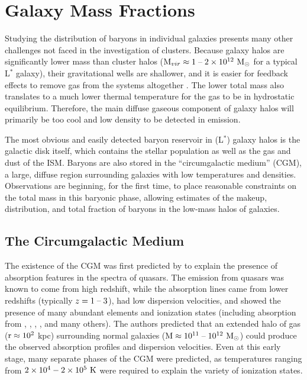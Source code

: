 

\section{Galaxy Mass Fractions}
\label{sec:Galaxy}

Studying the distribution of baryons in individual galaxies presents
many other challenges not faced in the investigation of
clusters. Because galaxy halos are significantly lower mass than
cluster halos ($\textrm{M\ensuremath{_{vir}}} \approx 1\;\textrm{--}\;2\times 10^{12}~\textrm{M}_\odot{}$ for a typical
L$^*$ galaxy), their gravitational wells are shallower, and it is
easier for feedback effects to remove gas from the systems altogether
. The lower total mass also translates to a
much lower thermal temperature for the gas to be in hydrostatic
equilibrium. Therefore, the main diffuse gaseous component of galaxy halos
will primarily be too cool and low density to be detected in
emission. 

The most obvious and easily detected baryon reservoir in (L$^*$)
galaxy halos is the galactic disk itself, which contains the stellar
population as well as the gas and dust of the ISM. Baryons are also
stored in the ``circumgalactic medium'' (CGM), a large, diffuse region
surrounding galaxies with low temperatures and densities. Observations
are beginning, for the first time, to place reasonable constraints on
the total mass in this baryonic phase, allowing estimates of the
makeup, distribution, and total fraction of baryons in the low-mass
halos of galaxies.

\subsection{The Circumgalactic Medium}
\label{sec:Galaxy.CGM}

The existence of the CGM was first predicted by \citet{Bahcall1969} to
explain the presence of absorption features in the spectra of
quasars. The emission from quasars was known to come from high
redshift, while the absorption lines came from lower redshifts
(typically $z = 1\;\textrm{--}\;3$), had low dispersion velocities, and showed
the presence of many abundant elements and ionization states
(including absorption from , , ,
, and many others). The authors predicted that an extended
halo of gas ($\textrm{r}{} \approx 10^2$ kpc) surrounding normal galaxies
($\textrm{M}{} \approx 10^{11}\;\textrm{--}\;10^{12}~\textrm{M}_\odot$) could produce the observed
absorption profiles and dispersion velocities. Even at this early
stage, many separate phases of the CGM were predicted, as temperatures
ranging from $2\times 10^{4} - 2\times 10^{5}~\textrm{K}$ were required to
explain the variety of ionization states.

